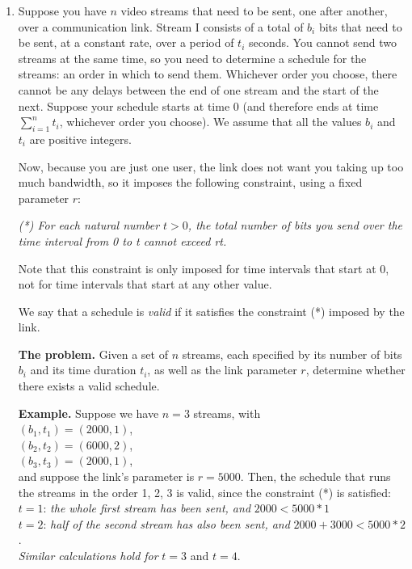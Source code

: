 \documentclass[11pts]{article}
\begin{document}
\begin{enumerate}
\newpage
\item Suppose you have $n$ video streams that need to be sent, one after
another, over a communication link. Stream I consists of a total of $b_i$
bits that need to be sent, at a constant rate, over a period of $t_i$
seconds. You cannot send two streams at the same time, 
so you need to determine a schedule for the streams: an order in which to
send them. Whichever order you choose, there cannot be any delays between the
end of one stream 
and the start of the next. Suppose your schedule starts at time 0
(and therefore ends at time $\sum_{i=1}^{n}t_i$, whichever order you choose).
We assume that all the values $b_i$ and $t_i$ are positive integers.
 
Now, because you are just one user, the link does not want you taking up too 
much bandwidth, so it imposes the following constraint, using a
fixed parameter $r$:

\textit{(*) For each natural number $t > 0$, the total number of bits
you send over the time interval from 0 to t cannot exceed rt.} 

Note that this constraint is only imposed for time intervals that
start at 0, not for time intervals that start at any other value. 

We say that a schedule is \emph{valid} if it satisfies the constraint
(*) imposed by the link.
 
\textbf{The problem.} Given a set of $n$ streams, each specified
by its number of bits $b_i$ and its time duration $t_i$, as well as
the link parameter $r$, determine whether there exists a valid 
schedule.

\textbf{Example.} Suppose we have $n = 3$ streams, with \\
 $(b_1, t_1) = (2000, 1)$, \\
$(b_2, t_2) = (6000, 2)$, \\
$(b_3, t_3) = (2000, 1)$, \\
and suppose the link’s parameter is $r = 5000$. Then, the schedule that
runs the streams in the order 1, 2, 3 is valid, since the constraint
(*) is satisfied: \\
$t = 1$: \textit{the whole first stream has been sent, and} $2000 < 5000*1$ \\ 
$t = 2$: \textit{half of the second stream has also been sent,
and} $2000+3000 < 5000*2$. \\
\textit{Similar calculations hold for} $t = 3$ and $t = 4$. \\


\end{enumerate}
\end{document}
